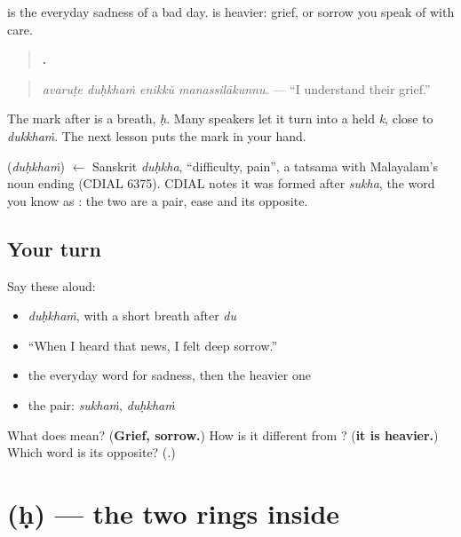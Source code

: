 \textbf{} is the everyday sadness of a bad day. \textbf{} is heavier: grief, or sorrow you speak of with care.

\begin{quote}
\textbf{   .}
\end{quote}

\begin{quote}
\emph{avaruṭe duḥkhaṁ enikkŭ manassilākunnu.} — \textquotedblleft{}I understand their grief.\textquotedblright{}
\end{quote}

The mark after \textbf{} is a breath, \emph{ḥ}. Many speakers let it turn into a held \emph{k}, close to \emph{dukkhaṁ}. The next lesson puts the mark in your hand.

\begin{cousinweb}
\textbf{} (\emph{duḥkhaṁ}) $\leftarrow$ Sanskrit \emph{duḥkha}, \textquotedblleft{}difficulty, pain\textquotedblright{}, a tatsama with Malayalam's noun ending (CDIAL 6375). CDIAL notes it was formed after \emph{sukha}, the word you know as \textbf{}: the two are a pair, ease and its opposite.
\end{cousinweb}

\subsection*{Your turn}
Say these aloud:

\begin{itemize}
\raggedright
  \item \emph{duḥkhaṁ}, with a short breath after \emph{du}
  \item \textquotedblleft{}When I heard that news, I felt deep sorrow.\textquotedblright{}
  \item the everyday word for sadness, then the heavier one
  \item the pair: \emph{sukhaṁ}, \emph{duḥkhaṁ}
\end{itemize}

\begin{tcolorbox}[breakable,colback=teal!4,colframe=teal!35!black,title={Before you move on}]
What does \textbf{} mean? (\textbf{Grief, sorrow.}) How is it different from \textbf{}? (\textbf{it is heavier.}) Which word is its opposite? (\textbf{}.)
\end{tcolorbox}
\section[\texorpdfstring{\ml{ഃ} (ḥ)}{ഃ (ḥ)}]{ (ḥ) — the two rings inside }


